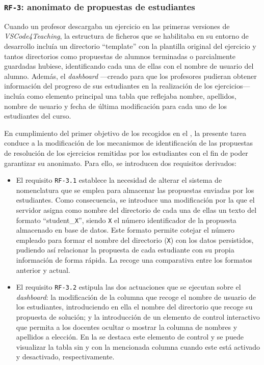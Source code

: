 \subsubsection{\texttt{RF-3}: anonimato de propuestas de estudiantes}
\label{subsec:rf3}

Cuando un profesor descargaba un ejercicio en las primeras versiones de \textit{VSCode4Teaching}, la estructura de ficheros que se habilitaba en su entorno de desarrollo incluía un directorio ``template'' con la plantilla original del ejercicio y tantos directorios como propuestas de alumnos terminadas o parcialmente guardadas hubiese, identificando cada una de ellas con el nombre de usuario del alumno. Además, el \textit{dashboard} ---creado para que los profesores pudieran obtener información del progreso de sus estudiantes en la realización de los ejercicios--- incluía como elemento principal una tabla que reflejaba nombre, apellidos, nombre de usuario y fecha de última modificación para cada uno de los estudiantes del curso.

En cumplimiento del primer objetivo de los recogidos en el , la presente tarea conduce a la modificación de los mecanismos de identificación de las propuestas de resolución de los ejercicios remitidas por los estudiantes con el fin de poder garantizar su anonimato. Para ello, se introducen dos requisitos derivados:

\begin{itemize}
    \item El requisito \texttt{RF-3.1} establece la necesidad de alterar el sistema de nomenclatura que se emplea para almacenar las propuestas enviadas por los estudiantes. Como consecuencia, se introduce una modificación por la que el servidor asigna como nombre del directorio de cada una de ellas un texto del formato ``student\_\texttt X'', siendo \texttt X el número identificador de la propuesta almacenado en base de datos. Este formato permite cotejar el número empleado para formar el nombre del directorio (\texttt X) con los datos persistidos, pudiendo así relacionar la propuesta de cada estudiante con su propia información de forma rápida. La  recoge una comparativa entre los formatos anterior y actual.
    \item El requisito \texttt{RF-3.2} estipula las dos actuaciones que se ejecutan sobre el \textit{dashboard}: la modificación de la columna que recoge el nombre de usuario de los estudiantes, introduciendo en ella el nombre del directorio que recoge su propuesta de solución; y la introducción de un elemento de control interactivo que permita a los docentes ocultar o mostrar la columna de nombres y apellidos a elección. En la  se destaca este elemento de control y se puede visualizar la tabla sin y con la mencionada columna cuando este está activado y desactivado, respectivamente.
\end{itemize}

